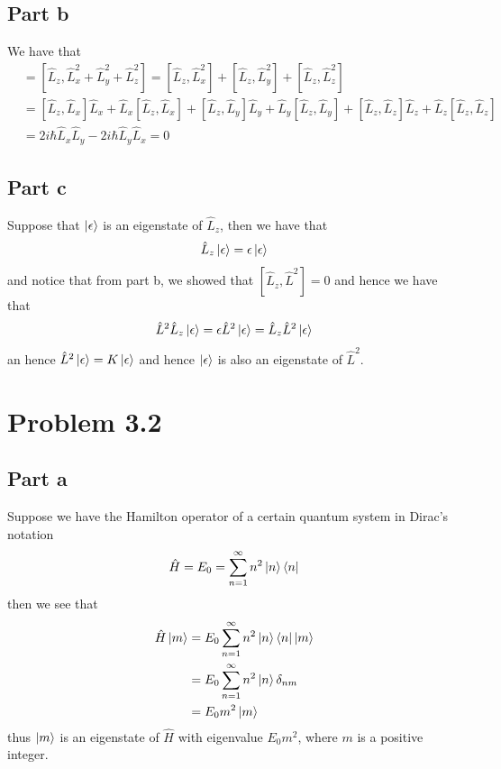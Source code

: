 \documentclass[12pt]{report}
\begin{document}
  \subsection*{Part b}
  We have that 
  \begin{align*}
    [\hat{L}_z, \hat{L}^2] &= [\hat{L}_z, \hat{L}_x^2 + \hat{L}_y^2 + \hat{L}_z^2] = [\hat{L}_z, \hat{L}_x^2] + [\hat{L}_z, \hat{L}_y^2] + [\hat{L}_z, \hat{L}_z^2] \\
    &= [\hat{L}_z, \hat{L}_x]\hat{L}_x + \hat{L}_x[\hat{L}_z, \hat{L}_x] + [\hat{L}_z, \hat{L}_y]\hat{L}_y + \hat{L}_y[\hat{L}_z, \hat{L}_y] + [\hat{L}_z, \hat{L}_z]\hat{L}_z + \hat{L}_z[\hat{L}_z, \hat{L}_z]\\
    &= 2i\hbar \hat{L}_x\hat{L}_y- 2i\hbar \hat{L}_y \hat{L}_x = 0
  \end{align*}

  \subsection*{Part c}
  Suppose that $\ket{\epsilon}$ is an eigenstate of $\hat{L}_z$, then we have that 
  \begin{equation*}
    \hat{L}_z\ket{\epsilon} = \epsilon\ket{\epsilon}
  \end{equation*}
  and notice that from part b, we showed that $[\hat{L}_z, \hat{L}^2] = 0$ and hence we have that
  \begin{equation*}
    \hat{L}^2 \hat{L}_z \ket{\epsilon} = \epsilon \hat{L}^2 \ket{\epsilon} =  \hat{L}_z \hat{L}^2 \ket{\epsilon}
  \end{equation*}
  an hence $\hat{L}^2 \ket{\epsilon} = K \ket{\epsilon}$ and hence $\ket{\epsilon}$ is also an eigenstate of $\hat{L}^2$.


\section*{Problem 3.2}
\subsection*{Part a}
Suppose we have the Hamilton operator of a certain quantum system in Dirac's notation
\begin{equation*}
  \hat{H} = E_0 = \sum_{n=1}^\infty n^2 \ket{n}\bra{n}
\end{equation*}
then we see that
\begin{align*}
  \hat{H} \ket{m} &= E_0 \sum_{n=1}^\infty n^2 \ket{n}\bra{n}\ket{m} \\
    &= E_0 \sum_{n=1}^\infty n^2 \ket{n}\delta_{nm} \\
    &= E_0 m^2 \ket{m}
\end{align*}
thus $\ket{m}$ is an eigenstate of $\hat{H}$ with eigenvalue $E_0 m^2$, where $m$ is a positive integer.
\end{document}
